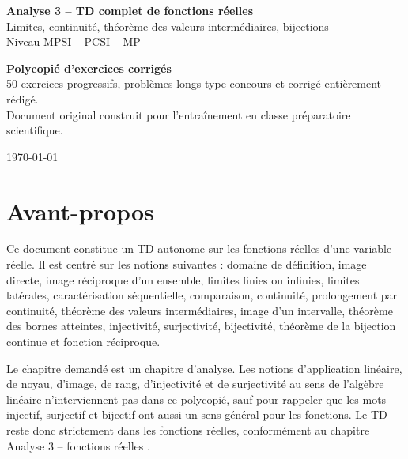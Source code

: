 \documentclass[11pt,a4paper]{article}
\begin{document}
\begin{titlepage}
\vspace*{0.6cm}
\begin{center}
{\color{white}\Huge\bfseries Analyse 3 -- TD complet de fonctions réelles}\\[0.3cm]
{\color{white}\Large Limites, continuité, théorème des valeurs intermédiaires, bijections}\\[0.4cm]
{\color{white}\large Niveau MPSI -- PCSI -- MP}\\[2.1cm]
\begin{tcolorbox}[width=0.88\textwidth,colback=white,colframe=bleuprepa,arc=2mm,boxrule=1pt]
\centering
\Large \textbf{Polycopié d'exercices corrigés}\\[0.25cm]
\normalsize 50 exercices progressifs, problèmes longs type concours et corrigé entièrement rédigé.\\[0.2cm]
\normalsize Document original construit pour l'entraînement en classe préparatoire scientifique.
\end{tcolorbox}
\vfill
{\large \today}
\end{center}
\end{titlepage}

\tableofcontents
\newpage

\section*{Avant-propos}
Ce document constitue un TD autonome sur les fonctions réelles d'une variable réelle. Il est centré sur les notions suivantes : domaine de définition, image directe, image réciproque d'un ensemble, limites finies ou infinies, limites latérales, caractérisation séquentielle, comparaison, continuité, prolongement par continuité, théorème des valeurs intermédiaires, image d'un intervalle, théorème des bornes atteintes, injectivité, surjectivité, bijectivité, théorème de la bijection continue et fonction réciproque.

\begin{attentionbox}
Le chapitre demandé est un chapitre d'analyse. Les notions d'application linéaire, de noyau, d'image, de rang, d'injectivité et de surjectivité au sens de l'algèbre linéaire n'interviennent pas dans ce polycopié, sauf pour rappeler que les mots injectif, surjectif et bijectif ont aussi un sens général pour les fonctions. Le TD reste donc strictement dans les fonctions réelles, conformément au chapitre \og Analyse 3 -- fonctions réelles \fg{}.
\end{attentionbox}
\end{document}
